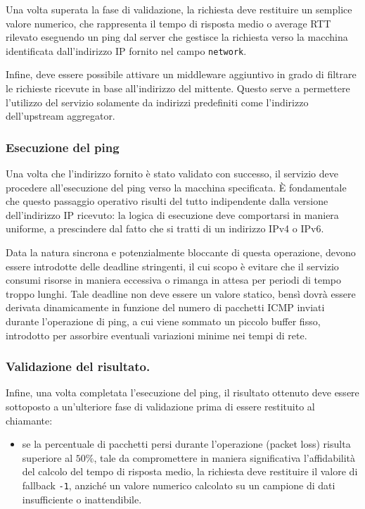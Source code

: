 Una volta superata la fase di validazione, la richiesta deve restituire un semplice valore numerico, che rappresenta il tempo di risposta medio o average \ac{RTT} rilevato eseguendo un ping dal server che gestisce la richiesta verso la macchina identificata dall'indirizzo \ac{IP} fornito nel campo \texttt{network}.

Infine, deve essere possibile attivare un middleware aggiuntivo in grado di filtrare le richieste ricevute in base all'indirizzo del mittente.
Questo serve a permettere l'utilizzo del servizio solamente da indirizzi predefiniti come l'indirizzo dell'upstream aggregator.
\subsubsection{Esecuzione del ping}
Una volta che l'indirizzo fornito è stato validato con successo, il servizio deve procedere all'esecuzione del ping verso la macchina specificata. È fondamentale che questo passaggio operativo risulti del tutto indipendente dalla versione dell'indirizzo \ac{IP} ricevuto: la logica di esecuzione deve comportarsi in maniera uniforme, a prescindere dal fatto che si tratti di un indirizzo IPv4 o IPv6.

Data la natura sincrona e potenzialmente bloccante di questa operazione, devono essere introdotte delle deadline stringenti, il cui scopo è evitare che il servizio consumi risorse in maniera eccessiva o rimanga in attesa per periodi di tempo troppo lunghi.
Tale deadline non deve essere un valore statico, bensì dovrà essere derivata dinamicamente in funzione del numero di pacchetti \ac{ICMP} inviati durante l'operazione di ping, a cui viene sommato un piccolo buffer fisso, introdotto per assorbire eventuali variazioni minime nei tempi di rete.

\subsubsection{Validazione del risultato.}
Infine, una volta completata l'esecuzione del ping, il risultato ottenuto deve essere sottoposto a un'ulteriore fase di validazione prima di essere restituito al chiamante:
\begin{itemize}
    \item se la percentuale di pacchetti persi durante l'operazione (packet loss) risulta superiore al $50\%$, tale da compromettere in maniera significativa l'affidabilità del calcolo del tempo di risposta medio, la richiesta deve restituire il valore di fallback \texttt{-1}, anziché un valore numerico calcolato su un campione di dati insufficiente o inattendibile.
\end{itemize}

